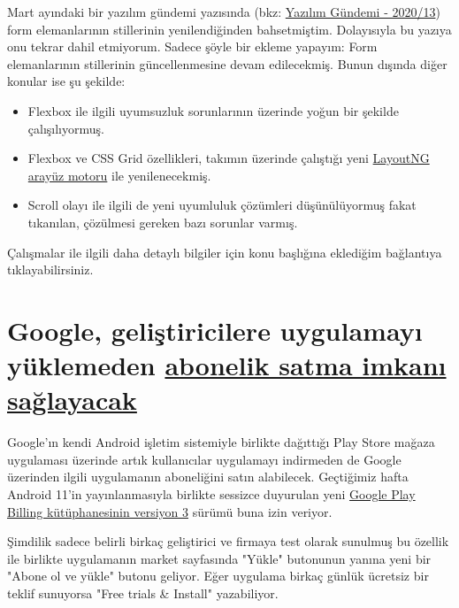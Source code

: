 \documentclass[11pt]{article}
\begin{document}
Mart ayındaki bir yazılım gündemi yazısında (bkz: \href{../13/yazilim-gundemi-2020-13.pdf}{Yazılım Gündemi - 2020/13})
form elemanlarının stillerinin yenilendiğinden bahsetmiştim. Dolayısıyla bu
yazıya onu tekrar dahil etmiyorum. Sadece şöyle bir ekleme yapayım: Form
elemanlarının stillerinin güncellenmesine devam edilecekmiş. Bunun dışında
diğer konular ise şu şekilde:

\begin{itemize}
\item Flexbox ile ilgili uyumsuzluk sorunlarının üzerinde yoğun bir şekilde
çalışılıyormuş.
\item Flexbox ve CSS Grid özellikleri, takımın üzerinde çalıştığı yeni \href{https://www.chromium.org/blink/layoutng}{LayoutNG
arayüz motoru} ile yenilenecekmiş.
\item Scroll olayı ile ilgili de yeni uyumluluk çözümleri düşünülüyormuş fakat
tıkanılan, çözülmesi gereken bazı sorunlar varmış.
\end{itemize}

Çalışmalar ile ilgili daha detaylı bilgiler için konu başlığına eklediğim
bağlantıya tıklayabilirsiniz.
\section{Google, geliştiricilere uygulamayı yüklemeden \href{https://techcrunch.com/2020/06/17/google-is-launching-a-way-to-buy-android-app-subscriptions-outside-of-the-app-itself/}{abonelik satma imkanı sağlayacak}}
\label{sec:org40a7d9a}
Google'ın kendi Android işletim sistemiyle birlikte dağıttığı Play Store
mağaza uygulaması üzerinde artık kullanıcılar uygulamayı indirmeden de Google
üzerinden ilgili uygulamanın aboneliğini satın alabilecek. Geçtiğimiz hafta
Android 11'in yayınlanmasıyla birlikte sessizce duyurulan yeni \href{https://android-developers.googleblog.com/2020/06/meet-google-play-billing-library.html}{Google Play
Billing kütüphanesinin versiyon 3} sürümü buna izin veriyor.

Şimdilik sadece belirli birkaç geliştirici ve firmaya test olarak sunulmuş bu
özellik ile birlikte uygulamanın market sayfasında "Yükle" butonunun yanına
yeni bir "Abone ol ve yükle" butonu geliyor. Eğer uygulama birkaç günlük
ücretsiz bir teklif sunuyorsa "Free trials \& Install" yazabiliyor.
\end{document}
